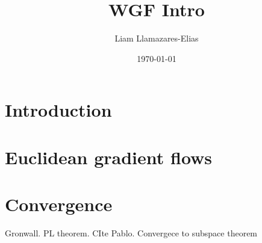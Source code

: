 \documentclass[
    a4paper,
    DIV=13,
    abstract=true,
    numbers=noenddot
]{scrartcl}
\begin{document}
\title{WGF Intro}
\author{Liam Llamazares-Elias}
\date{\today}
\maketitle
\section{Introduction}

\section{Euclidean gradient flows}

\section{Convergence}
Gronwall.
PL theorem. CIte Pablo.
Convergece to subspace theorem
\end{document}
